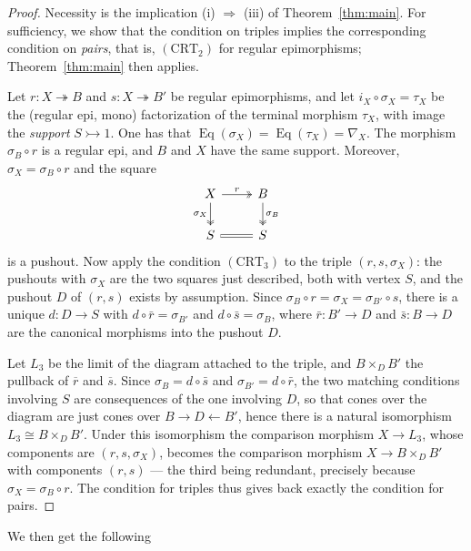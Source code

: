 \documentclass[11pt,a4paper]{article}
\theoremstyle{plain}
\theoremstyle{definition}
\theoremstyle{remark}
\theoremstyle{plain}
\newcommand{\Eq}{\operatorname{Eq}}
\begin{document}
\begin{proof}
Necessity is the implication (i) $\Rightarrow$ (iii) of
Theorem~\ref{thm:main}. For sufficiency, we show that the condition on
triples implies the corresponding condition on \emph{pairs}, that is,
$(\mathrm{CRT}_2)$ for regular epimorphisms; Theorem~\ref{thm:main} then
applies.

Let $r \colon X \twoheadrightarrow B$ and
$s \colon X \twoheadrightarrow B'$ be regular epimorphisms, and let
$i_X \circ \sigma_X = \tau_X $ be the (regular epi, mono) factorization
of the
terminal morphism $\tau_X$, with image the \emph{support}
$S \rightarrowtail 1$. One has that
$\Eq(\sigma_X) = \Eq(\tau_X) = \nabla_X$. The morphism $\sigma_B \circ r$ is a regular epi, and
$B$ and $X$ have the same support. Moreover, 
$\sigma_X = \sigma_B \circ r$ and the
square
\[
\begin{tikzcd}
X \arrow[r, two heads, "r"] \arrow[d, two heads, "\sigma_X"'] &
B \arrow[d, two heads, "\sigma_B"] \\
S \arrow[r, equal] & S
\end{tikzcd}
\]
is a pushout.
Now apply the condition $(\mathrm{CRT}_3)$ to the triple $(r, s, \sigma_X)$: the pushouts
with $\sigma_X$ are the two squares just described, both with vertex $S$,
and the pushout $D$ of $(r,s)$ exists by assumption.  Since
$\sigma_B \circ r = \sigma_X = \sigma_{B'} \circ s$, there is a unique
$d \colon D \to S$ with $d \circ \bar r = \sigma_{B'}$ and
$d \circ \bar s = \sigma_B$, where $\bar r \colon B' \to D$ and
$\bar s \colon B \to D$ are the canonical morphisms into the pushout $D$.

Let $L_3$ be the limit of the diagram attached to the triple, and
$B \times_D B'$ the pullback of $\overline{r}$ and $\overline{s}$.
Since $\sigma_B = d \circ \bar s$ and $\sigma_{B'} = d \circ \bar r$, the
two matching conditions involving $S$ are consequences of the one involving
$D$, so that cones over the diagram are just cones over
$B \to D \leftarrow B'$, hence there is a natural isomorphism
$L_3 \cong B \times_D B'$. Under this
isomorphism the comparison morphism $X \to L_3$, whose components are
$(r, s, \sigma_X)$, becomes the comparison morphism $X \to B \times_D B'$ with
components $(r,s)$ --- the third being redundant, precisely because
$\sigma_X = \sigma_B \circ r$. The condition for triples thus gives back
exactly the condition for pairs.


\end{proof}

We then get the following 
\end{document}
